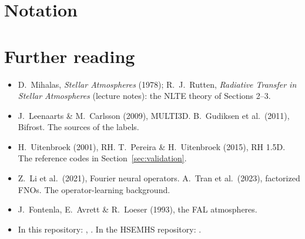 \section{Notation}

\section{Further reading}
\begin{itemize}
\item D.~Mihalas, \emph{Stellar Atmospheres} (1978); R.~J.~Rutten, \emph{Radiative Transfer in Stellar Atmospheres} (lecture notes): the NLTE theory of Sections 2--3.
\item J.~Leenaarts \& M.~Carlsson (2009), MULTI3D. B.~Gudiksen et al.\ (2011), Bifrost. The sources of the labels.
\item H.~Uitenbroek (2001), RH. T.~Pereira \& H.~Uitenbroek (2015), RH 1.5D. The reference codes in Section~\ref{sec:validation}.
\item Z.~Li et al.\ (2021), Fourier neural operators. A.~Tran et al.\ (2023), factorized FNOs. The operator-learning background.
\item J.~Fontenla, E.~Avrett \& R.~Loeser (1993), the FAL atmospheres.
\item In this repository: , . In the HSEMHS repository: .
\end{itemize}

